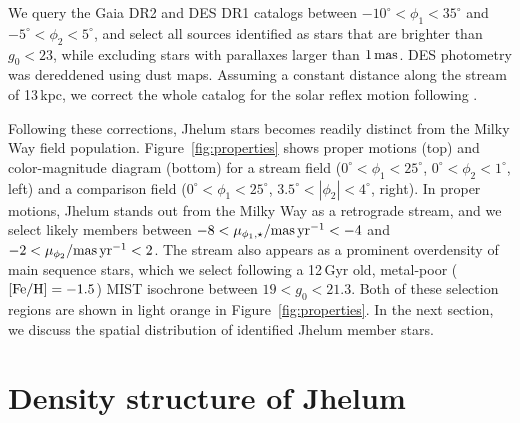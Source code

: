 \documentclass[twocolumn]{aastex62}
\begin{document}
We query the Gaia DR2 \citep{gdr2} and DES DR1 \citep{abbott2018} catalogs between $-10^\circ<\phi_1<35^\circ$ and $-5^\circ<\phi_2<5^\circ$, and select all sources identified as stars that are brighter than $g_0<23$, while excluding stars with parallaxes larger than $1\,\rm mas$.
DES photometry was dereddened using \citet{sfd} dust maps.
Assuming a constant distance along the stream of 13\,kpc, we correct the whole catalog for the solar reflex motion following \citet{pwb}.

Following these corrections, Jhelum stars becomes readily distinct from the Milky Way field population.
Figure~\ref{fig:properties} shows proper motions (top) and color-magnitude diagram (bottom) for a stream field ($0^\circ<\phi_1<25^\circ$, $0^\circ<\phi_2<1^\circ$, left) and a comparison field ($0^\circ<\phi_1<25^\circ$, $3.5^\circ<|\phi_2|<4^\circ$, right).
In proper motions, Jhelum stands out from the Milky Way as a retrograde stream, and we select likely members between $-8<\mu_{\phi_1,\star}/{\rm mas\,yr^{-1}}<-4$ and $-2<\mu_{\phi_2}/{\rm mas\,yr^{-1}}<2$.
The stream also appears as a prominent overdensity of main sequence stars, which we select following a 12\,Gyr old, metal-poor ($\rm[Fe/H]=-1.5$) MIST isochrone \citep{choi2016} between $19<g_0<21.3$.
Both of these selection regions are shown in light orange in Figure~\ref{fig:properties}.
In the next section, we discuss the spatial distribution of identified Jhelum member stars.


\section{Density structure of Jhelum}
\label{sec:structure}
\end{document}

